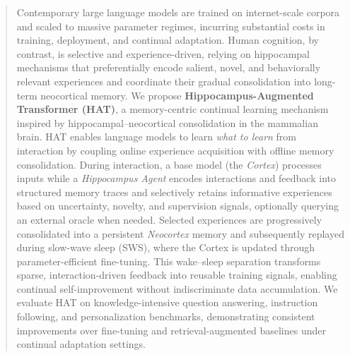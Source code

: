 \documentclass{article}
\begin{document}
\begin{abstract}
Contemporary large language models are trained on internet-scale corpora and scaled to massive parameter regimes, incurring substantial costs in training, deployment, and continual adaptation.
Human cognition, by contrast, is selective and experience-driven, relying on hippocampal mechanisms that preferentially encode salient, novel, and behaviorally relevant experiences and coordinate their gradual consolidation into long-term neocortical memory.
We propose \textbf{Hippocampus-Augmented Transformer (HAT)}, a memory-centric continual learning mechanism inspired by hippocampal--neocortical consolidation in the mammalian brain.
HAT enables language models to learn \emph{what to learn} from interaction by coupling online experience acquisition with offline memory consolidation.
During interaction, a base model (the \emph{Cortex}) processes inputs while a \emph{Hippocampus Agent} encodes interactions and feedback into structured memory traces and selectively retains informative experiences based on uncertainty, novelty, and supervision signals, optionally querying an external oracle when needed.
Selected experiences are progressively consolidated into a persistent \emph{Neocortex} memory and subsequently replayed during slow-wave sleep (SWS), where the Cortex is updated through parameter-efficient fine-tuning.
This wake--sleep separation transforms sparse, interaction-driven feedback into reusable training signals, enabling continual self-improvement without indiscriminate data accumulation.
We evaluate HAT on knowledge-intensive question answering, instruction following, and personalization benchmarks, demonstrating consistent improvements over fine-tuning and retrieval-augmented baselines under continual adaptation settings.
\end{abstract}
\end{document}
